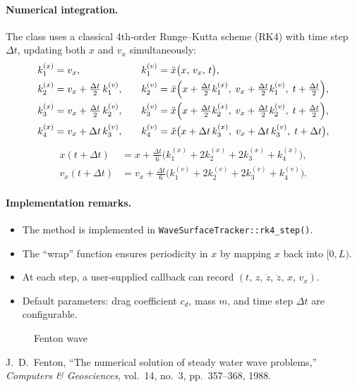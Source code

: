 \documentclass[11pt,letterpaper]{article}
\begin{document}
\paragraph{Numerical integration.}  
The class uses a classical 4th‐order Runge–Kutta scheme (RK4) with time step \(\Delta t\), updating both \(x\) and \(v_x\) simultaneously:
\[
\begin{aligned}
  k_{1}^{(x)} &= v_x, 
  &\quad
  k_{1}^{(v)} &= \ddot x\bigl(x,\,v_x,\,t\bigr),\\
  k_{2}^{(x)} &= v_x + \tfrac{\Delta t}{2}\,k_{1}^{(v)}, 
  &\quad
  k_{2}^{(v)} &= \ddot x\Bigl(x + \tfrac{\Delta t}{2}k_{1}^{(x)},\;v_x + \tfrac{\Delta t}{2}k_{1}^{(v)},\;t+\tfrac{\Delta t}{2}\Bigr),\\
  k_{3}^{(x)} &= v_x + \tfrac{\Delta t}{2}\,k_{2}^{(v)}, 
  &\quad
  k_{3}^{(v)} &= \ddot x\Bigl(x + \tfrac{\Delta t}{2}k_{2}^{(x)},\;v_x + \tfrac{\Delta t}{2}k_{2}^{(v)},\;t+\tfrac{\Delta t}{2}\Bigr),\\
  k_{4}^{(x)} &= v_x + \Delta t\,k_{3}^{(v)}, 
  &\quad
  k_{4}^{(v)} &= \ddot x\bigl(x + \Delta t\,k_{3}^{(x)},\;v_x + \Delta t\,k_{3}^{(v)},\;t+\Delta t\bigr),
\end{aligned}
\]
\[
\begin{aligned}
  x(t+\Delta t) &= x + \tfrac{\Delta t}{6}\bigl(k_{1}^{(x)} + 2k_{2}^{(x)} + 2k_{3}^{(x)} + k_{4}^{(x)}\bigr),\\
  v_x(t+\Delta t) &= v_x + \tfrac{\Delta t}{6}\bigl(k_{1}^{(v)} + 2k_{2}^{(v)} + 2k_{3}^{(v)} + k_{4}^{(v)}\bigr).
\end{aligned}
\]

\paragraph{Implementation remarks.}
\begin{itemize}
  \item The method is implemented in \texttt{WaveSurfaceTracker::rk4\_step()}.
  \item The “wrap” function ensures periodicity in \(x\) by mapping \(x\) back into \([0,L)\).
  \item At each step, a user‐supplied callback can record \((t,\,z,\,\dot z,\,\ddot z,\,x,\,v_x)\).
  \item Default parameters: drag coefficient \(c_d\), mass \(m\), and time step \(\Delta t\) are configurable.
\end{itemize}

\begin{figure}[h]
    \centering
    \caption{Fenton wave}
    \label{fig:wave}
\end{figure}

\begin{thebibliography}{1}
J.~D.~Fenton, “The numerical solution of steady water wave problems,” \emph{Computers \& Geosciences}, vol.~14, no.~3, pp.~357–368, 1988.
\end{thebibliography}
\end{document}
